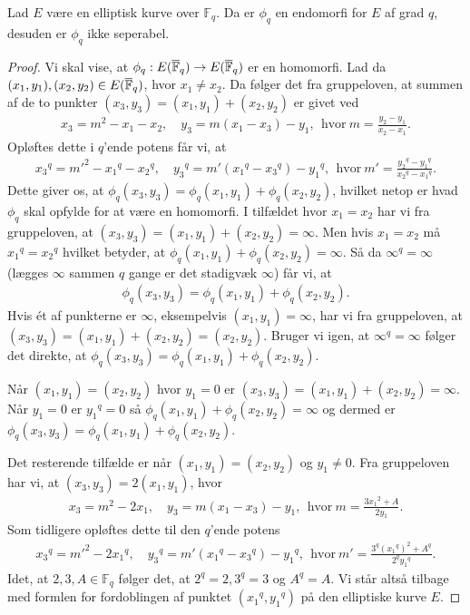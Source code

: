 \begin{lemma}
\label{lemma_end_degree_not_sep}
Lad $E$ være en elliptisk kurve over $\mathbb{F}_q$. Da er $\phi_q$ en 
endomorfi for $E$ af grad $q$, desuden er $\phi_q$ ikke seperabel.
\end{lemma}
\begin{proof}
Vi skal vise, at $\phi_q : E(\overline{\mathbb{F}}_q) \to E(\overline{\mathbb{F}}_q)$ er en homomorfi. Lad da $(x_1, y_1), (x_2, y_2) \in E(\overline{\mathbb{F}}_q)$, hvor $x_1 \neq x_2$. Da følger det fra gruppeloven, at summen af de to punkter $(x_3, y_3) = (x_1, y_1) + (x_2, y_2)$ er givet ved
\begin{align*}
	x_3 = m^2 - x_1 - x_2, \quad y_3 = m(x_1 - x_3) - y_1, \ \ \text{hvor} \ m=\frac{y_2-y_1}{x_2-x_1}.
\end{align*}
Opløftes dette i $q$'ende potens får vi, at 
\begin{align*}
	{x_3}^q = {m'}^2 - {x_1}^q - {x_2}^q, \quad {y_3}^q = m'({x_1}^q - {x_3}^q) - {y_1}^q, \ \
	\text{hvor} \ m' = \frac{{y_2}^q - {y_1}^q}{{x_2}^q - {x_1}^q}.
\end{align*}
Dette giver os, at $\phi_q(x_3, y_3) = \phi_q(x_1, y_1) + \phi_q(x_2, y_2)$, hvilket netop er hvad $\phi_q$ skal opfylde for at være en homomorfi. I tilfældet hvor $x_1=x_2$ har vi fra gruppeloven, at 
$(x_3, y_3) =(x_1, y_1) + (x_2, y_2) = \infty$. Men hvis $x_1 = x_2$ må ${x_1}^q = {x_2}^q$ hvilket betyder, at $\phi_q(x_1, y_1)+\phi_q(x_2, y_2) = \infty$. Så da $\infty^q = \infty$ (lægges $\infty$ sammen $q$ gange er det stadigvæk $\infty$) får vi, at 
\begin{align*}
	\phi_q(x_3, y_3) = \phi_q(x_1, y_1) + \phi_q(x_2,  y_2).
\end{align*}
Hvis ét af punkterne er $\infty$, eksempelvis $(x_1, y_1)=\infty$, har vi fra gruppeloven, at 
$(x_3, y_3) = (x_1, y_1)+(x_2, y_2) = (x_2, y_2)$. Bruger vi igen, at $\infty^q = \infty$ følger det direkte, at 
$\phi_q(x_3, y_3) = \phi_q(x_1, y_1) + \phi_q(x_2, y_2)$.

Når $(x_1, y_1)=(x_2, y_2)$ hvor $y_1 = 0$ er $(x_3, y_3) = (x_1, y_1)+(x_2, y_2) = \infty$. Når $y_1=0$ er ${y_1}^q=0$ så $\phi_q(x_1, y_1) + \phi_q(x_2, y_2) = \infty$ og dermed er $\phi_q(x_3, y_3) = \phi_q(x_1, y_1) + \phi_q(x_2, y_2)$. 

Det resterende tilfælde er når $(x_1, y_1)=(x_2, y_2)$ og $y_1 \neq 0$. Fra gruppeloven har vi, at 
$(x_3, y_3)= 2(x_1, y_1)$, hvor
\begin{align*}
	x_3 = m^2 - 2x_1, \quad y_3 = m(x_1-x_3)-y_1, \ \ \text{hvor} \ m=\frac{3{x_1}^2+A}{2y_1}.
\end{align*}
Som tidligere opløftes dette til den $q$'ende potens
\begin{align*}
	{x_3}^q = {m'}^2 - 2{x_1}^q, \quad {y_3}^q=m'({x_1}^q-{x_3}^q) - {y_1}^q, \ \ \text{hvor}
	\ m' = \frac{3^q ({x_1}^q)^2 + A^q}{2^q {y_1}^q}.
\end{align*}
Idet, at $2, 3, A \in \mathbb{F}_q$ følger det, at $2^q = 2, 3^q = 3$ og $A^q = A$. Vi står altså tilbage
med formlen for fordoblingen af punktet $({x_1}^q, {y_1}^q)$ på den elliptiske kurve $E$. 


\end{proof}

